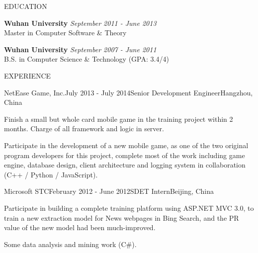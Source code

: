 \documentclass{resume} %
\begin{document}
\begin{rSection}{EDUCATION}

{\bf Wuhan University} \hfill {\em September 2011 - June 2013} \\
Master in Computer Software \& Theory
\vspace{0.3em}

{\bf Wuhan University} \hfill {\em September 2007 - June 2011} \\
B.S. in Computer Science \& Technology (GPA: 3.4/4)
\vspace{0.5em}

\end{rSection}

\begin{rSection}{EXPERIENCE}

\begin{rSubsection}{NetEase Game, Inc.}{July 2013 - July 2014}{Senior Development Engineer}{Hangzhou, China}
\item Finish a small but whole card mobile game in the training project within 2 months. Charge of all framework and logic in server.
\item Participate in the development of a new mobile game, as one of the two original program developers for this project, complete most of the work including game engine, database design, client architecture and logging system in collaboration (C++ / Python / JavaScript).

\end{rSubsection}
\begin{rSubsection}{Microsoft STC}{February 2012 - June 2012}{SDET Intern}{Beijing, China}
\item Participate in building a complete training platform using ASP.NET MVC 3.0, to train a new extraction model for News webpages in Bing Search, and the PR value of the new model had been much-improved.
\item Some data analysis and mining work (C\#).
\end{rSubsection}

\end{rSection}
\end{document}
